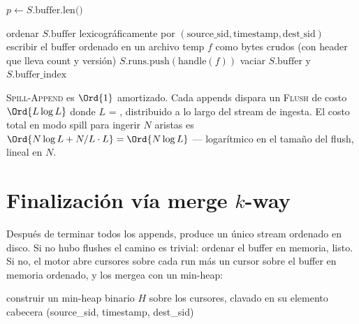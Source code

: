 \begin{algorithm}
\caption{\textsc{Spill-Append}}\label{alg:spill-append}
$p \gets S.\text{buffer.len()}$\;
\;
\;
\end{algorithm}

\begin{algorithm}
\caption{\textsc{Flush-Buffer-To-Run}}\label{alg:spill-flush}
ordenar $S.\text{buffer}$ lexicográficamente por $(\text{source\_sid},
\text{timestamp}, \text{dest\_sid})$\;
escribir el buffer ordenado en un archivo temp $f$ como bytes
crudos (con header que lleva count y versión)\;
$S.\text{runs}.\text{push}(\text{handle}(f))$\;
vaciar $S.\text{buffer}$ y $S.\text{buffer\_index}$\;
\end{algorithm}

\begin{complexity}
\textsc{Spill-Append} es $\Ord{1}$ amortizado. Cada
 appends dispara un \textsc{Flush} de costo
$\Ord{L \log L}$ donde $L$ = , distribuido a lo
largo del stream de ingesta. El costo total en modo spill para
ingerir $N$ aristas es
$\Ord{N \log L + N/L \cdot L} = \Ord{N \log L}$ --- logarítmico
en el tamaño del flush, lineal en $N$.
\end{complexity}

\section{Finalización vía merge $k$-way}

Después de terminar todos los appends,  produce un
único stream ordenado en disco. Si no hubo flushes el camino es
trivial: ordenar el buffer en memoria, listo. Si no, el motor abre
cursores sobre cada run más un cursor sobre el buffer en memoria
ordenado, y los mergea con un min-heap:

\begin{algorithm}
\caption{\textsc{K-Way-Merge}}\label{alg:kway-merge}
construir un min-heap binario $H$ sobre los cursores, clavado en
su elemento cabecera (source\_sid, timestamp, dest\_sid)\;
\end{algorithm}

